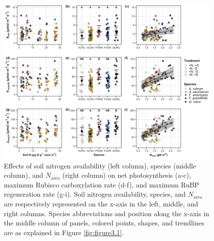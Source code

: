 \newpage
\begin{figure}
    \includegraphics[width=\textwidth]{ch3_NxpH/figs/NxS_fig2_leafbiochem.jpg}
    \centering
    \caption[Effects of soil nitrogen availability, species, and leaf nitrogen content on net photosynthesis, maximum Rubisco carboxylation rate, and maximum RuBP regeneration rate]{Effects of soil nitrogen availability (left column), species (middle column), and $N_\mathrm{area}$ (right column) on net photosynthesis (a-c), maximum Rubisco carboxylation rate (d-f), and maximum RuBP regeneration rate (g-i). Soil nitrogen availability, species, and $N_\mathrm{area}$ are respectively represented on the x-axis in the left, middle, and right columns. Species abbreviations and position along the x-axis in the middle column of panels, colored points, shapes, and trendlines are as explained in Figure \ref{fig:figure3.1}.}
    \label{fig:figure3.2}
\end{figure}
\clearpage

\newpage
